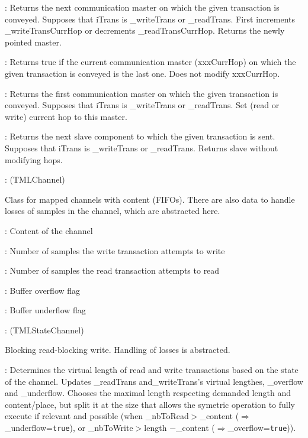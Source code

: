 \documentclass[a4paper,11pt]{article}
\newcommand{\bfont}{\fontseries{b}\selectfont}
\newcommand{\cod}[1]{{\ttfamily #1}}
\newcommand{\class}[2]{\par\vspace{1mm}\hspace{-5mm}\large\colorbox{file}{\textbullet\bfont\cod{#1}:} (\cod{#2})\par}
\newcommand{\method}[1]{\par\vspace{1mm}\hspace{-2mm}\colorbox{method}{\textopenbullet\bfont\cod{#1}:}}
\newcommand{\variable}[1]{\par\vspace{1mm}\hspace{-2mm}\colorbox{variable}{\textopenbullet\bfont\cod{#1}:}}
\begin{document}
\method{getNextMaster(iTrans)} Returns the next communication master on which the given transaction is conveyed. Supposes that \cod{iTrans} is \cod{\_writeTrans} or \cod{\_readTrans}. First increments \cod{\_writeTransCurrHop} or decrements \cod{\_readTransCurrHop}. Returns the newly pointed master.
\method{isLastMaster(iTrans)} Returns true if the current communication master (\cod{xxxCurrHop}) on which the given transaction is conveyed is the last one. Does not modify \cod{xxxCurrHop}.

\method{getFirstMaster(iTrans)} Returns the first communication master on which the given transaction is conveyed. Supposes that \cod{iTrans} is \cod{\_writeTrans} or \cod{\_readTrans}. Set (read or write) current hop to this master.

\method{getNextSlave(iTrans)} Returns the next slave component to which the given transaction is sent. Supposes that \cod{iTrans} is \cod{\_writeTrans} or \cod{\_readTrans}. Returns slave without modifying hops.

\class{TMLStateChannel}{TMLChannel}
Class for mapped channels with content (FIFOs). There are also data to handle losses of samples in the channel, which are abstracted here.

\variable{\_content} Content of the channel

\variable{\_nbToWrite} Number of samples the write transaction attempts to write

\variable{\_nbToRead} Number of samples the read transaction attempts to read
	
\variable{\_overflow} Buffer overflow flag
	
\variable{\_underflow} Buffer underflow flag
	

\class{TMLbrbwChannel}{TMLStateChannel}
Blocking read-blocking write. Handling of losses is abstracted.
\method{setTransactionLength()} Determines the virtual length of read and write transactions based on the state of the channel. Updates \cod{\_readTrans} and\cod{\_writeTrans}'s virtual lengthes, \cod{\_overflow} and \cod{\_underflow}. Chooses the maximal length respecting demanded length and content/place, but split it at the size that allows the symetric operation to fully execute if relevant and possible (when \cod{\_nbToRead}$>${\_content} ($\Rightarrow$ \cod{\_underflow}={\tt true}), or \cod{\_nbToWrite}$>$\cod{length $-$\_content} ($\Rightarrow$\cod{\_overflow}={\tt true})).
\end{document}

